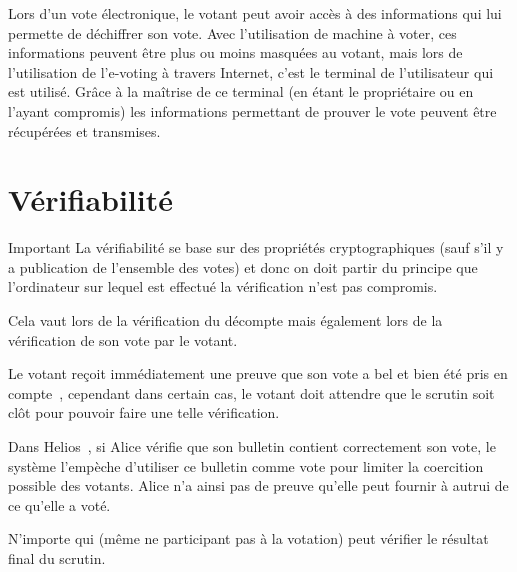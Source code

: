 \documentclass[../report]{subfiles}
\begin{document}
Lors d'un vote électronique, le votant peut avoir accès à des informations qui lui permette de déchiffrer son vote.
Avec l'utilisation de machine à voter, ces informations peuvent être plus ou moins masquées au votant, mais lors
de l'utilisation de l'e-voting à travers Internet, c'est le terminal de l'utilisateur qui est utilisé.
Grâce à la maîtrise de ce terminal (en étant le propriétaire ou en l'ayant compromis) les informations permettant
de prouver le vote peuvent être récupérées et transmises.

\section{Vérifiabilité}

\begin{important}{Important}
  La vérifiabilité se base sur des propriétés cryptographiques (sauf s'il y a publication 
  de l'ensemble des votes) et donc on doit partir du principe que l'ordinateur sur lequel 
  est effectué la vérification n'est pas compromis.

  Cela vaut lors de la vérification du décompte mais également 
  lors de la vérification de son vote par le votant.
\end{important}

Le votant reçoit immédiatement une preuve que son vote a bel et bien été pris en 
compte~\cite{adida_ballot_2006}, cependant dans certain cas, le votant doit attendre que 
le scrutin soit clôt pour pouvoir faire une telle vérification.

Dans Helios~\cite{noauthor_helios_nodate}, si Alice vérifie que son bulletin contient
correctement son vote, le système l'empèche d'utiliser ce bulletin comme vote pour limiter
la coercition possible des votants.
Alice n'a ainsi pas de preuve qu'elle peut fournir à autrui de ce qu'elle a voté.

N'importe qui (même ne participant pas à la votation) peut vérifier le résultat final du scrutin.
\end{document}
